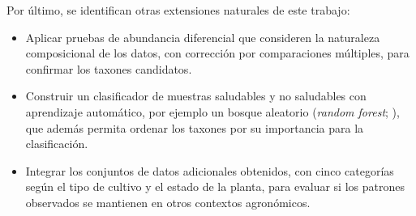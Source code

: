 Por último, se identifican otras extensiones naturales de este trabajo:
\begin{itemize}
    \item Aplicar pruebas de abundancia diferencial que consideren la naturaleza composicional de
    los datos, con corrección por comparaciones múltiples, para confirmar los taxones candidatos.
    \item Construir un clasificador de muestras saludables y no saludables con aprendizaje
    automático, por ejemplo un bosque aleatorio (\emph{random forest}; \citealp{breiman2001random}), que además permita ordenar
    los taxones por su importancia para la clasificación.
    \item Integrar los conjuntos de datos adicionales obtenidos, con cinco categorías según el tipo
    de cultivo y el estado de la planta, para evaluar si los patrones observados se mantienen en
    otros contextos agronómicos.
\end{itemize}
